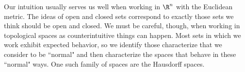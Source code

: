 \label{chap:Hausdorff_topology}


\vspace*{-17 pt}
\framebox{\hspace*{3 pt}
\parbox{4.7 in}{\begin{fqs}
\item 

\end{fqs}} \hspace*{3 pt}}

\vspace*{13 pt}

\label{sec_haus_intro}

Our intuition usually serves us well when working in $\R^n$ with the Euclidean metric. The ideas of open and closed sets correspond to exactly those sets we think should be open and closed. We must be careful, though, when working in topological spaces as counterintuitive things can happen. Most sets in which we work exhibit expected behavior, so we identify those characterize that we consider to be ``normal" and then characterize the spaces that behave in these ``normal" ways. One such family of spaces are the Hausdorff spaces.

